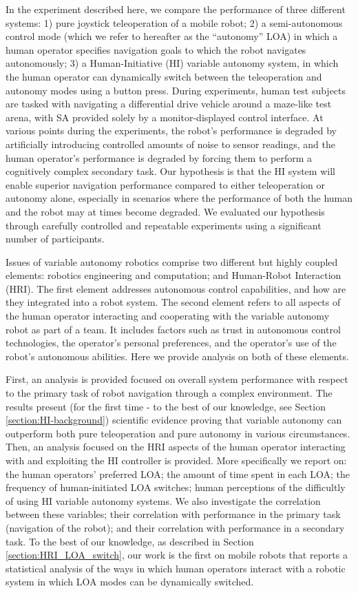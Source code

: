 \documentclass[a4paper,12pt,oneside,openright]{bhamthesis}
\begin{document}
In the experiment described here, we compare the performance of three different systems: 1) pure joystick teleoperation of a mobile robot; 2) a semi-autonomous control mode (which we refer to hereafter as the ``autonomy'' LOA) in which a human operator specifies navigation goals to which the robot navigates autonomously; 3) a Human-Initiative (HI) variable autonomy system, in which the human operator can dynamically switch between the teleoperation and autonomy modes using a button press. During experiments, human test subjects are tasked with navigating a differential drive vehicle around a maze-like test arena, with SA provided solely by a monitor-displayed control interface. At various points during the experiments, the robot's performance is degraded by artificially introducing controlled amounts of noise to sensor readings, and the human operator's performance is degraded by forcing them to perform a cognitively complex secondary task.  Our hypothesis is that the HI system will enable superior navigation performance compared to either teleoperation or autonomy alone, especially in scenarios where the performance of both the human and the robot may at times become degraded. We evaluated our hypothesis through carefully controlled and repeatable experiments using a significant number of participants.

Issues of variable autonomy robotics comprise two different but highly coupled elements: robotics engineering and computation; and Human-Robot Interaction (HRI). The first element addresses autonomous control capabilities, and how are they integrated into a robot system. The second element refers to all aspects of the human operator interacting and cooperating with the variable autonomy robot as part of a team. It includes factors such as trust in autonomous control technologies, the operator's personal preferences, and the operator's use of the robot's autonomous abilities. Here we provide analysis on both of these elements.

First, an analysis is provided focused on overall system performance with respect to the primary task of robot navigation through a complex environment. The results present (for the first time - to the best of our knowledge, see Section \ref{section:HI-background}) scientific evidence proving that variable autonomy can outperform both pure teleoperation and pure autonomy in various circumstances. Then, an analysis focused on the HRI aspects of the human operator interacting with and exploiting the HI controller is provided. More specifically we report on: the human operators' preferred LOA; the amount of time spent in each LOA; the frequency of human-initiated LOA switches; human perceptions of the difficultly of using HI variable autonomy systems. We also investigate the correlation between these variables; their correlation with performance in the primary task (navigation of the robot); and their correlation with performance in a secondary task. To the best of our knowledge, as described in Section \ref{section:HRI_LOA_switch}, our work is the first on mobile robots that reports a statistical analysis of the ways in which human operators interact with a robotic system in which LOA modes can be dynamically switched.
\end{document}
